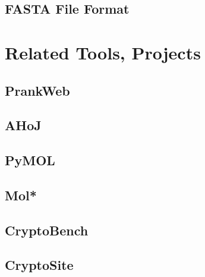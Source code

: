 \subsection{FASTA File Format}
\label{sec:fasta-format}

\section{Related Tools, Projects}
\label{sec:related-tools}

\subsection{PrankWeb}
\label{sec:prankweb}

\subsection{AHoJ}
\label{sec:ahoj}

\subsection{PyMOL}
\label{sec:pymol}

\subsection{Mol*}
\label{sec:molstar}

\subsection{CryptoBench}
\label{sec:cryptobench}

\subsection{CryptoSite}
\label{sec:cryptosite}

